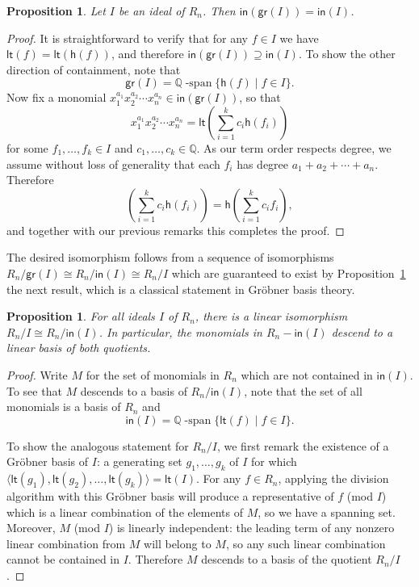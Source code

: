 \documentclass[12pt]{amsart}
\newtheorem{prop}[equation]{Proposition}
\theoremstyle{definition}
\theoremstyle{remark}
\numberwithin{equation}{section}
\newcommand{\QQ}{\mathbb{Q}}
\newcommand{\spanning}{\operatorname{-span}}
\renewcommand{\setminus}{-}
\begin{document}
\begin{prop}
\label{prop:grin}
Let $I$ be an ideal of $R_{n}$.  Then $\mathsf{in}(\mathsf{gr}(I)) = \mathsf{in}(I)$.
\end{prop}
\begin{proof}
It is straightforward to verify that for any $f \in I$ we have $\mathsf{lt}(f) = \mathsf{lt}(\mathsf{h}(f))$, and therefore $\mathsf{in}(\mathsf{gr}(I)) \supseteq \mathsf{in}(I)$. To show the other direction of containment, note that
\[
\mathsf{gr}(I) = \QQ\spanning\{\mathsf{h}(f) \;|\; f \in I\}.
\]
Now fix a monomial $x_{1}^{a_{1}} x_{2}^{a_{2}}\cdots x_{n}^{a_{n}} \in \mathsf{in}(\mathsf{gr}(I))$, so that
\[
x_{1}^{a_{1}}  x_{2}^{a_{2}} \cdots x_{n}^{a_{n}} = \mathsf{lt}\left(\sum_{i =1}^{k} c_{i} \mathsf{h}(f_{i}) \right)
\]
for some $f_{1}, \ldots, f_{k} \in I$ and $c_{1}, \ldots, c_{k} \in \QQ$.  As our term order respects degree, we assume without loss of generality that each $f_{i}$ has degree $a_{1} + a_{2} + \cdots + a_{n}$.  Therefore 
\[
\left(\sum_{i =1}^{k} c_{i} \mathsf{h}(f_{i}) \right) = \mathsf{h}\left(\sum_{i =1}^{k} c_{i} f_{i} \right),
\]
and together with our previous remarks this completes the proof.
\end{proof}

The desired isomorphism follows from a sequence of isomorphisms $R_{n}\big/\mathsf{gr}(I) \cong R_{n}\big/\mathsf{in}(I) \cong R_{n}\big/I$ which are guaranteed to exist by Proposition~\ref{prop:grin} the next result, which is a classical statement in Gr\"{o}bner basis theory.  

\begin{prop}
\label{prop:Gbasis}
For all ideals $I$ of $R_{n}$, there is a linear isomorphism $R_{n}\big/I \cong R_{n} \big/ \mathsf{in}(I)$.  In particular, the monomials in $R_{n} \setminus \mathsf{in}(I)$ descend to a linear basis of both quotients.
\end{prop}
\begin{proof}
Write $M$ for the set of monomials in $R_{n}$ which are not contained in $\mathsf{in}(I)$.  To see that $M$ descends to a basis of $R_{n} \big/ \mathsf{in}(I)$, note that the set of all monomials is a basis of $R_{n}$ and 
\[
\mathsf{in}(I) = \QQ\spanning\{\mathsf{lt}(f) \;|\; f \in I\}.
\]

To show the analogous statement for $R_{n}\big/I$, we first remark the existence of a Gr\"{o}bner basis of $I$: a generating set $g_{1}, \ldots, g_{k}$ of $I$ for which $\langle \mathsf{lt}(g_{1}), \mathsf{lt}(g_{2}), \ldots, \mathsf{lt}(g_{k}) \rangle = \mathsf{lt}(I)$.
For any $f \in R_{n}$, applying the division algorithm with this Gr\"{o}bner basis will produce a representative of $f$ (mod $I$) which is a linear combination of the elements of $M$, so we have a spanning set.  
Moreover, $M$ (mod $I$) is linearly independent: the leading term of any nonzero linear combination from $M$ will belong to $M$, so any such linear combination cannot be contained in $I$.  
Therefore $M$ descends to a basis of the quotient $R_n\big/I$.
\end{proof}
\end{document}
